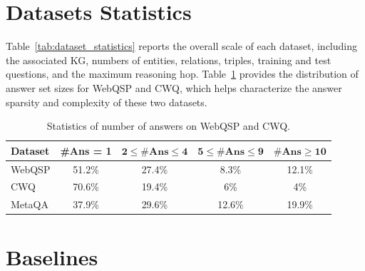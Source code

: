 \documentclass{article}
\begin{document}
\section{Datasets Statistics}\label{app:datasets}


Table~\ref{tab:dataset_statistics} reports the overall scale of each dataset, including the associated KG, numbers of entities, relations, triples, training and test questions, and the maximum reasoning hop. Table~\ref{tab:answer_number_statistics} provides the distribution of answer set sizes for WebQSP and CWQ, which helps characterize the answer sparsity and complexity of these two datasets.

\begin{table}[htbp]
\centering
\caption{Statistics of the datasets.}
\label{tab:dataset_statistics}
\end{table}

\begin{table}[htbp]
\centering
\caption{Statistics of number of answers on WebQSP and CWQ.}
\label{tab:answer_number_statistics}
\begin{tabular}{lcccc}
\toprule
\textbf{Dataset} 
& \textbf{\#Ans = 1} 
& $\mathbf{2 \leq \#}\textbf{Ans}\mathbf{\leq 4}$ 
& $\mathbf{5 \leq \#}\textbf{Ans}\mathbf{\leq 9}$ 
& $\mathbf{\#}\textbf{Ans}\mathbf{\geq 10}$ \\
\midrule
WebQSP & 51.2\% & 27.4\% & 8.3\% & 12.1\% \\
CWQ & 70.6\% & 19.4\% & 6\% & 4\% \\
MetaQA & 37.9\% & 29.6\% & 12.6\% & 19.9\% \\
\bottomrule
\end{tabular}
\end{table}


\section{Baselines}\label{app:baselines}
\end{document}
